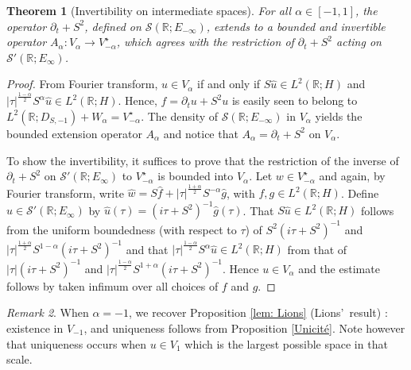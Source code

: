 \documentclass[11pt, letterpaper]{amsart}
\newtheorem{thm}{Theorem}[section]
\theoremstyle{definition}
\theoremstyle{remark}
\newtheorem{rem}[thm]{Remark}
\numberwithin{equation}{section}
\begin{document}
\begin{thm}[Invertibility on intermediate spaces]\label{ISOMORPHISM}
    For all $\alpha\in [-1,1]$, the operator $ \partial_t + S^2 $, defined on $\mathcal{S}(\mathbb{R};E_{-\infty})$, extends to a bounded and invertible  operator $ A_\alpha :  V_\alpha \rightarrow V_{-\alpha}^\star$, which agrees with the restriction of $\partial_t + S^2$ acting on $\mathcal{S}'(\mathbb{R};E_\infty)$.
\end{thm}
\begin{proof}
From Fourier transform, $u\in V_\alpha$ if and only if $S\hat u \in L^2(\mathbb{R}; H)$ and $|\tau|^{\frac{1-\alpha}{2}} S^\alpha \hat u \in L^2(\mathbb{R}; H)$. 
Hence, $f=\partial_tu + S^2u$ is easily seen to belong to  $  L^2(\mathbb{R};D_{S,-1}) + W_{\alpha}=V_{-\alpha}^\star$. The density of $\mathcal{S}(\mathbb{R};E_{-\infty})$ in $V_\alpha$ yields the bounded extension operator $A_{\alpha}$ and notice that $A_{\alpha}=\partial_t + S^2$ on $V_\alpha$.

To show the invertibility, it suffices to prove that the restriction of the inverse of $\partial_t + S^2$ on $\mathcal{S}'(\mathbb{R};E_\infty)$ to  $V_{-\alpha}^\star$ is bounded into $V_\alpha$. Let $w\in V_{-\alpha}^\star$ and again, by Fourier transform,  write $\hat w= S \hat f+ |\tau|^{\frac{1+\alpha}{2}}S^{-\alpha} \hat g$, with $f,g\in L^2(\mathbb{R};H)$.  Define $u\in \mathcal{S}'(\mathbb{R};E_\infty) $ by $\hat u(\tau)= \left ( i\tau+S^2 \right )^{-1} \hat{g}(\tau)$. That $ S\hat u \in L^2(\mathbb{R};H) $ follows from the uniform boundedness (with respect to $\tau$) of $S^2(i\tau + S^2)^{-1}$ and $|\tau|^{\frac{1+\alpha}{2}}S^{1-\alpha}(i\tau + S^2)^{-1}$ and that $|\tau|^{\frac{1-\alpha}{2}}S^{\alpha} \hat u \in L^2(\mathbb{R};H)  $ from that of $|\tau|(i\tau + S^2)^{-1}$ and  $|\tau|^{\frac{1-\alpha}{2}}S^{1+\alpha}(i\tau + S^2)^{-1}$.  Hence $u\in V_\alpha$ and the estimate follows by taken infimum over all choices of $f$ and $g$. 
\end{proof}

\begin{rem}
 When $\alpha=-1$, we recover Proposition \ref{lem: Lions} (Lions'~result) : existence in $V_{-1}$, and  uniqueness follows from Proposition \ref{Unicité}. 
 Note however that uniqueness occurs 
 when $u\in V_1$ which is the largest possible space in that scale.
\end{rem}
    
\end{document}
